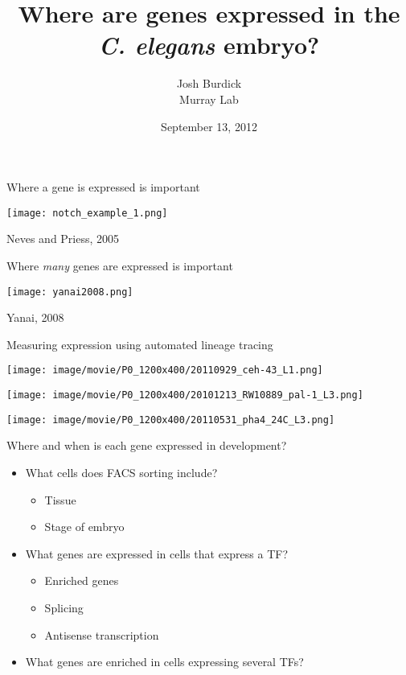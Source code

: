 \documentclass[serif,9pt]{beamer}
\title{Where are genes expressed in the {\em C. elegans} embryo?}
\author{Josh Burdick \\ Murray Lab}
\date{September 13, 2012}
\begin{document}
\begin{frame}
\titlepage
\end{frame}

\begin{frame}{Where a gene is expressed is important}

\begin{centering}
\texttt{[image: notch\_example\_1.png]}
\end{centering}

\hfill Neves and Priess, 2005

\end{frame}

\begin{frame}{Where {\em many} genes are expressed is important}

\texttt{[image: yanai2008.png]}

\hfill Yanai, 2008

\end{frame}

\begin{frame}{Measuring expression using automated lineage tracing}

{\center
\texttt{[image: image/movie/P0\_1200x400/20110929\_ceh-43\_L1.png]}

\texttt{[image: image/movie/P0\_1200x400/20101213\_RW10889\_pal-1\_L3.png]}

\texttt{[image: image/movie/P0\_1200x400/20110531\_pha4\_24C\_L3.png]}

}

\end{frame}

\begin{frame}{Where and when is each gene expressed in development?}
\begin{itemize}
\item What cells does FACS sorting include?
\begin{itemize}
\item Tissue
\item Stage of embryo
\end{itemize}
\item What genes are expressed in cells that express a TF?
\begin{itemize}
\item Enriched genes
\item Splicing
\item Antisense transcription
\end{itemize}
\item What genes are enriched in cells expressing several TFs?
\end{itemize}
\end{frame}
\end{document}
